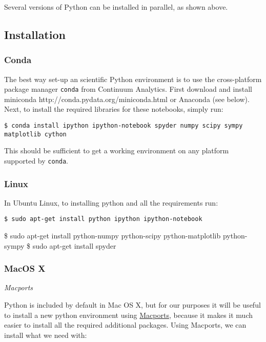 \documentclass[11pt]{article}
\begin{document}
Several versions of Python can be installed in parallel, as shown above.

    \hypertarget{installation}{%
\subsection{Installation}\label{installation}}

    \hypertarget{conda}{%
\subsubsection{Conda}\label{conda}}

    The best way set-up an scientific Python environment is to use the
cross-platform package manager \texttt{conda} from Continuum Analytics.
First download and install miniconda
http://conda.pydata.org/miniconda.html or Anaconda (see below). Next, to
install the required libraries for these notebooks, simply run:

\begin{verbatim}
$ conda install ipython ipython-notebook spyder numpy scipy sympy matplotlib cython
\end{verbatim}

This should be sufficient to get a working environment on any platform
supported by \texttt{conda}.

    \hypertarget{linux}{%
\subsubsection{Linux}\label{linux}}

    In Ubuntu Linux, to installing python and all the requirements run:

\begin{verbatim}
$ sudo apt-get install python ipython ipython-notebook
\end{verbatim}

\$ sudo apt-get install python-numpy python-scipy python-matplotlib
python-sympy \$ sudo apt-get install spyder

    \hypertarget{macos-x}{%
\subsubsection{MacOS X}\label{macos-x}}

    \emph{Macports}

Python is included by default in Mac OS X, but for our purposes it will
be useful to install a new python environment using
\href{http://www.macports.org/}{Macports}, because it makes it much
easier to install all the required additional packages. Using Macports,
we can install what we need with:
\end{document}
